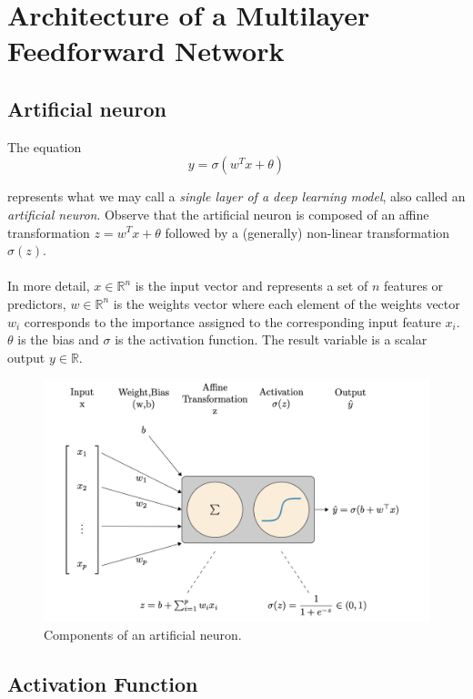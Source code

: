 \documentclass[../main.tex]{subfiles}
\begin{document}
	 \section{Architecture of a Multilayer Feedforward Network}
	 \subsection{Artificial neuron}
	 \noindent The equation
	  \begin{equation}
	  	y=\sigma(w^Tx + \theta) \tag{2}
	  	\label{eq:sig}
	  \end{equation}
  
   \noindent represents what we may call a \textit{single layer of a deep learning model}, also called an \textit{artificial neuron}.  Observe that the artificial neuron is composed of an affine transformation $ z=w^Tx + \theta$ followed by a (generally) non-linear transformation $\sigma(z)$. \\ \\ In more detail, $x \in \mathbb{R}^n$ is the input vector and represents a set of $n$ features or predictors, $w\in  \mathbb{R}^n$ is the weights vector where each element of the weights vector $w_i$ corresponds to the importance assigned to the corresponding input feature $x_i$. $\theta$ is the bias and $\sigma$ is the activation function. The result variable is a scalar output $y \in \mathbb{R}$. 
 
   
   \begin{figure}[h]
   	\centering
   	\includegraphics[width=0.8\linewidth]{imgs/neu}
   	\caption{\small Components of an artificial neuron. \cite{mateng}} 
   \end{figure} \mbox{} \par
   
  
 \subsection{Activation Function}
 
\end{document}
